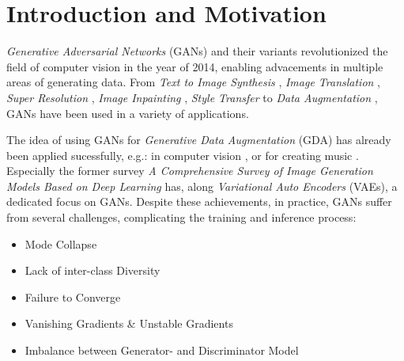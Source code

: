 \section{Introduction and Motivation}\label{introduction_and_motivation}
\pagestyle{fancy}
\textit{Generative Adversarial Networks} (GANs) \cite{goodfellow2014generativeadversarialnetworks} and their variants revolutionized the field of computer vision in the year of 2014, enabling advacements in multiple areas of generating data. From \textit{Text to Image Synthesis} \cite{reed2016generativeadversarialtextimage}, \textit{Image Translation} \cite{isola2018imagetoimagetranslationconditionaladversarial}, \textit{Super Resolution} \cite{ledig2017photorealisticsingleimagesuperresolution}, \textit{Image Inpainting} \cite{pathak2016contextencodersfeaturelearning}, \textit{Style Transfer} \cite{wang2023multimodalityguidedimagestyletransfer} to \textit{Data Augmentation} \cite{shorten2019survey}, GANs have been used in a variety of applications.

The idea of using GANs for \textit{Generative Data Augmentation} (GDA) has already been applied sucessfully, e.g.: in computer vision \cite{Li2025comprehensivesurvedeepimages}, \cite{biswas2023generativeadversarialnetworksdata} or for creating music \cite{ji2020comprehensivesurveydeepmusic}. Especially the former survey \textit{A Comprehensive Survey of Image Generation Models Based on Deep Learning} has, along \textit{Variational Auto Encoders} (VAEs), a dedicated focus on GANs. Despite these achievements, in practice, GANs suffer from several challenges, complicating the training and inference process:

\begin{itemize}\label{problems_of_gans}
    \setlength{\itemsep}{-5pt}
    \item Mode Collapse
    \item Lack of inter-class Diversity
    \item Failure to Converge
    \item Vanishing Gradients \& Unstable Gradients
    \item Imbalance between Generator- and Discriminator Model
\end{itemize}

